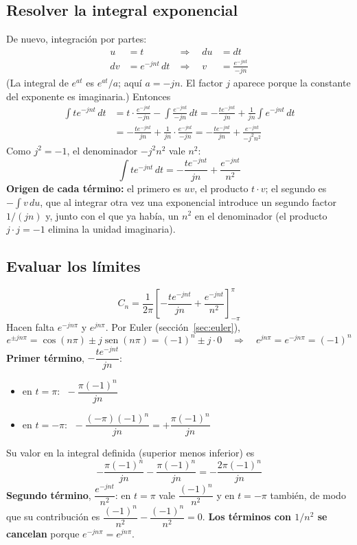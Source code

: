 \documentclass[11pt,a4paper]{article}
\DeclareMathOperator{\sen}{sen}
\begin{document}
\subsection{Resolver la integral exponencial}
De nuevo, integración por partes:
\begin{align*}
  u&=t &\Rightarrow\quad du&=dt\\
  dv&=e^{-jnt}\,dt &\Rightarrow\quad v&=\frac{e^{-jnt}}{-jn}
\end{align*}
(La integral de $e^{at}$ es $e^{at}/a$; aquí $a=-jn$. El factor $j$ aparece porque la
constante del exponente es imaginaria.) Entonces
\begin{align*}
  \int te^{-jnt}\,dt
  &=t\cdot\frac{e^{-jnt}}{-jn}-\int\frac{e^{-jnt}}{-jn}\,dt
   =-\frac{te^{-jnt}}{jn}+\frac{1}{jn}\int e^{-jnt}\,dt\\
  &=-\frac{te^{-jnt}}{jn}+\frac{1}{jn}\cdot\frac{e^{-jnt}}{-jn}
   =-\frac{te^{-jnt}}{jn}+\frac{e^{-jnt}}{-j^{2}n^{2}}
\end{align*}
Como $j^{2}=-1$, el denominador $-j^{2}n^{2}$ vale $n^{2}$:
\begin{equation*}
  \boxed{\int te^{-jnt}\,dt=-\frac{te^{-jnt}}{jn}+\frac{e^{-jnt}}{n^{2}}}
\end{equation*}
\textbf{Origen de cada término:} el primero es $uv$, el producto $t\cdot v$; el segundo es
$-\int v\,du$, que al integrar otra vez una exponencial introduce un segundo factor
$1/(jn)$ y, junto con el que ya había, un $n^{2}$ en el denominador (el producto
$j\cdot j=-1$ elimina la unidad imaginaria).

\subsection{Evaluar los límites}
\begin{equation*}
  C_n=\frac{1}{2\pi}\left[-\frac{te^{-jnt}}{jn}+\frac{e^{-jnt}}{n^{2}}\right]_{-\pi}^{\pi}
\end{equation*}
Hacen falta $e^{-jn\pi}$ y $e^{jn\pi}$. Por Euler (sección~\ref{sec:euler}),
\begin{equation*}
  e^{\pm jn\pi}=\cos(n\pi)\pm j\sen(n\pi)=(-1)^{n}\pm j\cdot 0
  \quad\Longrightarrow\quad
  \boxed{e^{jn\pi}=e^{-jn\pi}=(-1)^{n}}
\end{equation*}
\textbf{Primer término}, $-\dfrac{te^{-jnt}}{jn}$:
\begin{itemize}
    \item en $t=\pi$: $\;-\dfrac{\pi(-1)^{n}}{jn}$
    \item en $t=-\pi$: $\;-\dfrac{(-\pi)(-1)^{n}}{jn}=+\dfrac{\pi(-1)^{n}}{jn}$
\end{itemize}
Su valor en la integral definida (superior menos inferior) es
\begin{equation*}
  -\frac{\pi(-1)^{n}}{jn}-\frac{\pi(-1)^{n}}{jn}=-\frac{2\pi(-1)^{n}}{jn}
\end{equation*}
\textbf{Segundo término}, $\dfrac{e^{-jnt}}{n^{2}}$: en $t=\pi$ vale $\dfrac{(-1)^{n}}{n^{2}}$
y en $t=-\pi$ también, de modo que su contribución es
$\dfrac{(-1)^{n}}{n^{2}}-\dfrac{(-1)^{n}}{n^{2}}=0$. \textbf{Los términos con $1/n^{2}$ se
cancelan} porque $e^{-jn\pi}=e^{jn\pi}$.
\end{document}
